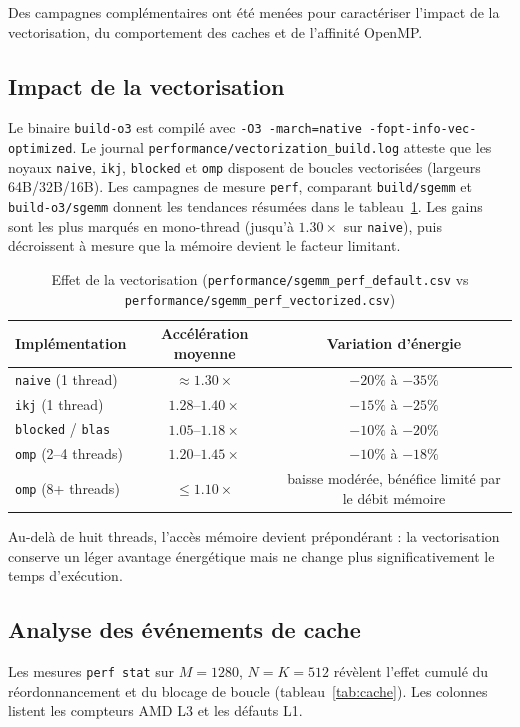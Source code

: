 \documentclass[a4paper,11pt]{article}
\begin{document}
Des campagnes complémentaires ont été menées pour caractériser l'impact de la vectorisation, du comportement des caches et de l'affinité OpenMP.

\subsection{Impact de la vectorisation}\label{subsec:vectorization}
Le binaire \texttt{build-o3} est compilé avec \texttt{-O3 -march=native -fopt-info-vec-optimized}. Le journal \texttt{performance/vectorization\_build.log} atteste que les noyaux \texttt{naive}, \texttt{ikj}, \texttt{blocked} et \texttt{omp} disposent de boucles vectorisées (largeurs 64B/32B/16B). Les campagnes de mesure \texttt{perf}, comparant \texttt{build/sgemm} et \texttt{build-o3/sgemm} donnent les tendances résumées dans le tableau~\ref{tab:vectorization}. Les gains sont les plus marqués en mono-thread (jusqu'à $1.30\times$ sur \texttt{naive}), puis décroissent à mesure que la mémoire devient le facteur limitant.

\begin{table}[H]
\centering
\caption{Effet de la vectorisation (\texttt{performance/sgemm\_perf\_default.csv} vs \texttt{performance/sgemm\_perf\_vectorized.csv})}
\label{tab:vectorization}
\begin{tabular}{lcc}
\toprule
Implémentation & Accélération moyenne & Variation d'énergie \\
\midrule
\texttt{naive} (1 thread) & $\approx 1.30\times$ & $-20\%$ à $-35\%$ \\
\texttt{ikj} (1 thread) & $1.28$--$1.40\times$ & $-15\%$ à $-25\%$ \\
\texttt{blocked} / \texttt{blas} & $1.05$--$1.18\times$ & $-10\%$ à $-20\%$ \\
\texttt{omp} (2--4 threads) & $1.20$--$1.45\times$ & $-10\%$ à $-18\%$ \\
\texttt{omp} (8+ threads) & $\leq 1.10\times$ & baisse modérée, bénéfice limité par le débit mémoire \\
\bottomrule
\end{tabular}
\end{table}

Au-delà de huit threads, l'accès mémoire devient prépondérant : la vectorisation conserve un léger avantage énergétique mais ne change plus significativement le temps d'exécution.

\subsection{Analyse des événements de cache}\label{subsec:cache-events}
Les mesures \texttt{perf stat} sur $M=1280$, $N=K=512$ révèlent l'effet cumulé du réordonnancement et du blocage de boucle (tableau~\ref{tab:cache}). Les colonnes listent les compteurs AMD L3 et les défauts L1.
\end{document}
